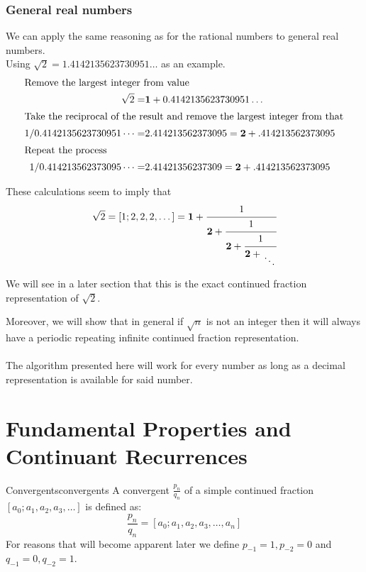 \documentclass[a4paper]{article}
\begin{document}
\subsubsection{General real numbers}
We can apply the same reasoning as for the rational numbers to general real numbers. \\
Using $\sqrt{2} = 1.4142135623730951 \dots $ as an example.
\begin{align*}
  \shortintertext{Remove the largest integer from value}
  \sqrt{2} =                   & \textbf{1} + 0.4142135623730951 \dots             \\
  \shortintertext{Take the reciprocal of the result and remove the largest integer from that}
  1/0.4142135623730951 \dots = & 2.414213562373095 = \textbf{2} + .414213562373095 \\
  \shortintertext{Repeat the process}
  1/0.414213562373095 \dots =  & 2.41421356237309 = \textbf{2} + .414213562373095
\end{align*}

These calculations seem to imply that
\[
  \sqrt{2} = [1;2,2,2,\dots] =
  \textbf{1} + \cfrac{1}{\textbf{2}+\cfrac{1}{\textbf{2} +\cfrac{1}{\textbf{2} + \CFDots}}}
\]

We will see in a later section that this is the exact continued fraction representation of $\sqrt{2}$.

Moreover, we will show that in general if $\sqrt{n}$ is not an integer then it will always have a periodic repeating infinite continued fraction representation. \\
\\
The algorithm presented here will work for every number as long as a decimal representation is available for said number.

\section{Fundamental Properties and Continuant Recurrences}\label{cf:sec:useful-lemmas}
\begin{mydefinition}{Convergents}{convergents}
A convergent $\frac{p_n}{q_n}$ of a simple continued fraction $[a_0; a_1, a_2, a_3, \dots]$ is defined as:
\[
  \frac{p_n}{q_n} = [a_0; a_1, a_2, a_3, \dots, a_n]
\]
For reasons that will become apparent later we define $p_{-1} = 1, p_{-2} = 0$ and $q_{-1} = 0, q_{-2} = 1$.
\end{mydefinition}
\end{document}
